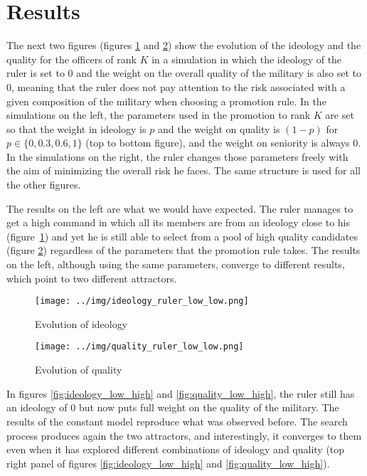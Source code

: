 \section{Results}
\label{sec:results}

The next two figures (figures \ref{fig:ideology_low_low} and
\ref{fig:quality_low_low}) show the evolution of the ideology and the quality
for the officers of rank $K$ in a simulation in which the ideology of the ruler
is set to 0 and the weight on the overall quality of the military is also set to
0, meaning that the ruler does not pay attention to the risk associated with a
given composition of the military when choosing a promotion rule. In the
simulations on the left, the parameters used in the promotion to rank $K$ are
set so that the weight in ideology is $p$ and the weight on quality is $(1-p)$
for $p \in \{0, 0.3, 0.6, 1\}$ (top to bottom figure), and the weight on
seniority is always 0. In the simulations on the right, the ruler changes those
parameters freely with the aim of minimizing the overall risk he faces. The same
structure is used for all the other figures.

The results on the left are what we would have expected. The ruler manages to
get a high command in which all its members are from an ideology close to his
(figure~\ref{fig:ideology_low_low}) and yet he is still able to select from a
pool of high quality candidates (figure \ref{fig:quality_low_low}) regardless of
the parameters that the promotion rule takes. The results on the left, although
using the same parameters, converge to different results, which point to two
different attractors.

\begin{figure}[!h]
  \centering
  \caption{Evolution of ideology}
  \texttt{[image: ../img/ideology\_ruler\_low\_low.png]}
  \label{fig:ideology_low_low}
\end{figure}

\begin{figure}[!h]
  \centering
  \caption{Evolution of quality}
  \texttt{[image: ../img/quality\_ruler\_low\_low.png]}
  \label{fig:quality_low_low}
\end{figure}

\clearpage

In figures \ref{fig:ideology_low_high} and \ref{fig:quality_low_high}, the ruler
still has an ideology of 0 but now puts full weight on the quality of the
military. The results of the constant model reproduce what was observed before.
The search process produces again the two attractors, and interestingly, it
converges to them even when it has explored different combinations of ideology
and quality (top right panel of figures \ref{fig:ideology_low_high} and
\ref{fig:quality_low_high}).
 
